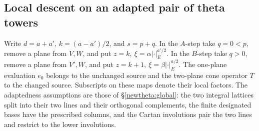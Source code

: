 \subsection{Local descent on an adapted pair of theta towers}
\label{tcr:main}

Write \(d=a+a'\), \(k=(a-a')/2\), and \(s=p+q\). In the
\(A\)-step take \(q=0<p\), remove a plane from \(V,W\), and put
\(z=k,\ \xi=\alpha|\cdot|_E^{a'/2}\). In the \(B\)-step take
\(q>0\), remove a plane from \(V',W\), and put
\(z=k+1,\ \xi=\beta|\cdot|_E^{a/2}\).
The one-plane evaluation \(e_0\) belongs to the unchanged source
and the two-plane cone operator \(T\) to the changed source. Subscripts
on these maps denote their local factors. The adaptedness assumptions
are those of \S\ref{newtheta:global}: the two integral lattices
split into their two lines and their orthogonal complements, the
finite designated bases have the prescribed columns, and the Cartan
involutions pair the two lines and restrict to the lower involutions.

